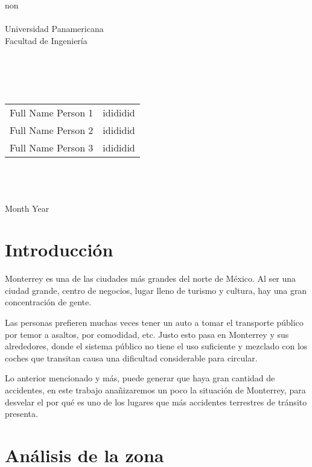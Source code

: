 \documentclass[a4paper]{article}
\begin{document}
\hspace{0pt}
\vfill

\begin{center}
    {\huge non}\\    \quad\\
    {\large Universidad Panamericana}\\
    {\large Facultad de Ingeniería}\\
    \quad\\
    \quad\\

    \quad\\
    \quad\\
    \begin{tabular}{c|c}
        Full Name Person 1 & idididid\\
        Full Name Person 2 & idididid\\
        Full Name Person 3 & idididid\\
    \end{tabular}\\
    \quad\\
    \quad\\
    Month Year\\
\end{center}

\vfill
\newpage


\section{Introducción}
Monterrey es una de las ciudades más grandes del norte de México. Al ser una ciudad grande, centro de negocios, lugar lleno de turismo y cultura, hay una gran concentración de gente.

Las personas prefieren muchas veces tener un auto a tomar el transporte público por temor a asaltos, por comodidad, etc. Justo esto pasa en Monterrey y sus alrededores, donde el sistema público no tiene el uso suficiente y mezclado con los coches que transitan causa una dificultad considerable para circular.

Lo anterior mencionado y más, puede generar que haya gran cantidad de accidentes, en este trabajo anañizaremos un poco la situación de Monterrey, para desvelar el por qué es uno de los lugares que más accidentes terrestres de tránsito presenta.
 
\section{Análisis de la zona}
\end{document}
